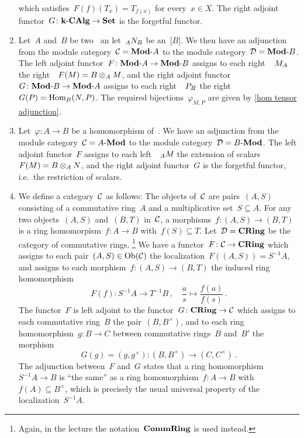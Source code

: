 \begin{example}
\begin{enumerate}
\[      \]
      which satisfies~$F(f)(T_x) = T_{f(x)}$ for every~$x \in X$.
      The right adjoint functor~$G \colon \text{$\mathbf{k}$-$\mathbf{CAlg}$} \to \mathbf{Set}$ is the forgetful functor.
    \item
      Let~$A$ and~$B$ be two~{\kalgs} an let~$\indmodule[A]{N}[B]$ be an~{[$B$]}.
      We then have an adjunction from the module category~$\mathcal{C} = \text{$\mathbf{Mod}$-$A$}$ to the module category~$\mathcal{D} = \text{$\mathbf{Mod}$-$B$}$.
      The left adjoint functor~$F \colon \text{$\mathbf{Mod}$-$A$} \to \text{$\mathbf{Mod}$-$B$}$ assigns to each right~{}~$\indmodule{M}[A]$ the right~{}~$F(M) = B \otimes_A M$, and the right adjoint functor~$G \colon \text{$\mathbf{Mod}$-$B$} \to \text{$\mathbf{Mod}$-$A$}$ assigns to each right~{}~$\indmodule{P}[B]$ the right~{}~$G(P) = \operatorname{Hom}_B(N,P)$.
      The required bijections~$\varphi_{M,P}$ are given by \cref{hom tensor adjunction}.
    \item
      Let~$\varphi \colon A \to B$ be a homomorphism of~{\kalgs}.
      We have an adjunction from the module category~$\mathcal{C} = \text{$A$-$\mathbf{Mod}$}$ to the module category~$\mathcal{D} = \text{$B$-$\mathbf{Mod}$}$.
      The left adjoint functor~$F$ assigns to each left~{}~$\indmodule[A]{M}$ the extension of scalars~$F(M) = B \otimes_A N$, and the right adjoint functor~$G$ is the forgetful functor, i.e.\ the restriction of scalars.
    \item
      We define a category~$\mathcal{C}$ as follows:
      The objects of~$\mathcal{C}$ are pairs~$(A,S)$ consisting of a commutative ring~$A$ and a multiplicative set~$S \subseteq A$.
      For any two objects~$(A,S)$ and~$(B,T)$ in~$\mathcal{C}$, a morphisms~$f \colon (A,S) \to (B,T)$ is a ring homomorpism~$f \colon A \to B$ with~$f(S) \subseteq T$.
      Let~$\mathcal{D} = \mathbf{CRing}$ be the category of commutative rings.%
      \footnote{Again, in the lecture the notation~$\mathbf{CommRing}$ is used instead.}
      We have a functor~$F \colon \mathcal{C} \to \mathbf{CRing}$ which assigns to each pair~$(A,S) \in \operatorname{Ob}(\mathcal{C})$ the localization~$F((A,S)) = S^{-1} A$, and assigns to each morphism~$f \colon (A,S) \to (B,T)$ the induced ring homomorphism
      \[
                F(f)
        \colon  S^{-1} A
        \to     T^{-1} B \,,
        \quad   \frac{a}{s}
        \mapsto \frac{f(a)}{f(s)} \,.
      \]
      The functor~$F$ is left adjoint to the functor~$G \colon \mathbf{CRing} \to \mathcal{C}$ which assigns to each commutative ring~$B$ the pair~$(B,B^\times)$, and to each ring homomorphism~$g \colon B \to C$ between commutative rings~$B$ and~$B'$ the morphism
      \[
                G(g)
        =       (g, g^\times)
        \colon  (B, B^\times)
        \to     (C, C^\times) \,.
      \]
      The adjunction between~$F$ and~$G$ states that a ring homomorphism~$S^{-1} A \to B$ is \enquote{the same} as a ring homomorphism~$f \colon A \to B$ with~$f(A) \subseteq B^\times$, which is precisely the usual universal property of the localization~$S^{-1} A$.
  \end{enumerate}
\end{example}


